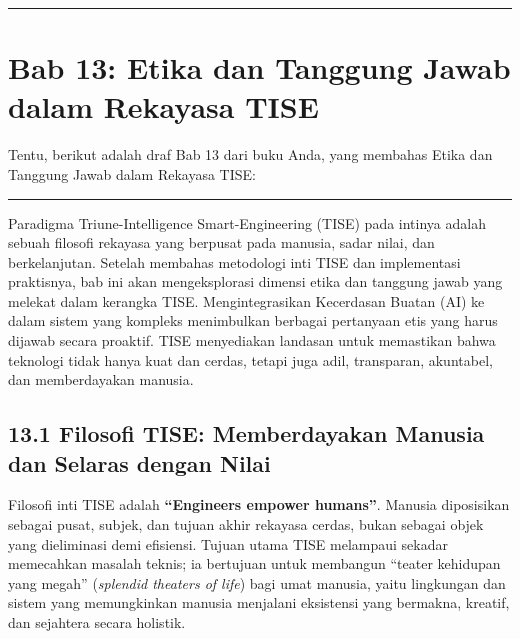 \documentclass[
  letterpaper,
  DIV=11,
  numbers=noendperiod]{scrreprt}
\begin{document}
\begin{center}\rule{0.5\linewidth}{0.5pt}\end{center}


\chapter{\texorpdfstring{\textbf{Bab 13: Etika dan Tanggung Jawab dalam
Rekayasa
TISE}}{Bab 13: Etika dan Tanggung Jawab dalam Rekayasa TISE}}\label{bab-13-etika-dan-tanggung-jawab-dalam-rekayasa-tise}

Tentu, berikut adalah draf Bab 13 dari buku Anda, yang membahas Etika
dan Tanggung Jawab dalam Rekayasa TISE:

\begin{center}\rule{0.5\linewidth}{0.5pt}\end{center}

Paradigma Triune-Intelligence Smart-Engineering (TISE) pada intinya
adalah sebuah filosofi rekayasa yang berpusat pada manusia, sadar nilai,
dan berkelanjutan. Setelah membahas metodologi inti TISE dan
implementasi praktisnya, bab ini akan mengeksplorasi dimensi etika dan
tanggung jawab yang melekat dalam kerangka TISE. Mengintegrasikan
Kecerdasan Buatan (AI) ke dalam sistem yang kompleks menimbulkan
berbagai pertanyaan etis yang harus dijawab secara proaktif. TISE
menyediakan landasan untuk memastikan bahwa teknologi tidak hanya kuat
dan cerdas, tetapi juga adil, transparan, akuntabel, dan memberdayakan
manusia.

\section{\texorpdfstring{\textbf{13.1 Filosofi TISE: Memberdayakan
Manusia dan Selaras dengan
Nilai}}{13.1 Filosofi TISE: Memberdayakan Manusia dan Selaras dengan Nilai}}\label{filosofi-tise-memberdayakan-manusia-dan-selaras-dengan-nilai}

Filosofi inti TISE adalah \textbf{``Engineers empower humans''}. Manusia
diposisikan sebagai pusat, subjek, dan tujuan akhir rekayasa cerdas,
bukan sebagai objek yang dieliminasi demi efisiensi. Tujuan utama TISE
melampaui sekadar memecahkan masalah teknis; ia bertujuan untuk
membangun ``teater kehidupan yang megah'' (\emph{splendid theaters of
life}) bagi umat manusia, yaitu lingkungan dan sistem yang memungkinkan
manusia menjalani eksistensi yang bermakna, kreatif, dan sejahtera
secara holistik.
\end{document}
